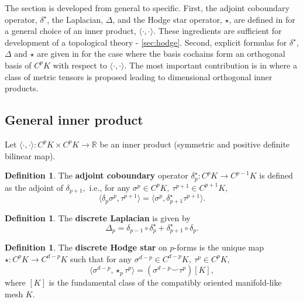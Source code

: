\documentclass{elsarticle}
\theoremstyle{definition}
\newtheorem{definition}[theorem]{Definition}
\newcommand{\R}{\mathbb{R}} %
\newcommand{\inner}[2]{\langle#1,#2\rangle}
\begin{document}
The section is developed from general to specific. First, the adjoint coboundary operator, $\delta^\star$, the Laplacian, $\Delta$, and the Hodge star operator, $\star$, are defined in  for a general choice of an inner product, $\inner{\cdot}{\cdot}$. These ingredients are sufficient for development of a topological theory - \ref{sec:hodge}. Second, explicit formulas for $\delta^\star$, $\Delta$ and $\star$ are given in  for the case where the basis cochains form an orthogonal basis of $C^p K$ with respect to $\inner{\cdot}{\cdot}$. The most important contribution is in  where a class of metric tensors is proposed leading to dimensional orthogonal inner products.

\subsection{General inner product}
\label{sec:inner_general}
Let $\inner{\cdot}{\cdot} \colon C^{p} K \times C^{p} K \to \R$ be an inner product (symmetric and positive definite bilinear map).
\begin{definition}
  The \textbf{adjoint coboundary} operator $\delta^{\star}_{p} \colon C^{p} K \to C^{p - 1} K$ is defined as the adjoint of $\delta_{p + 1},$ i.e., for any $\sigma^{p} \in C^{p} K,\ \tau^{p + 1} \in C^{p + 1} K$,
  \begin{equation}
    \inner{\delta_{p} \sigma^{p}}{\tau^{p + 1}} 
      = \inner{\sigma^{p}}{\delta^{\star}_{p + 1} \tau^{p + 1}}.
  \end{equation}
\end{definition}
\begin{definition}
  The \textbf{discrete Laplacian} is given by
  \begin{equation}
    \Delta_{p} 
      =   \delta_{p - 1} \circ \delta^{\star}_{p} 
        + \delta^{\star}_{p + 1} \circ \delta_{p}.
  \end{equation}
\end{definition}
\begin{definition}
  The \textbf{discrete Hodge star} on $p$-forms is the unique map $\star \colon C^{p} K \to C^{d - p} K$ such that for any $\sigma^{d - p} \in C^{d - p} K ,\ \tau^{p} \in C^{p} K,$
  \begin{equation}
    \inner{\sigma^{d - p}}{\star_{p} \tau^{p}} 
      = (\sigma^{d - p} \smile \tau^{p})[K],
  \end{equation}
  where $[K]$ is the fundamental class of the compatibly oriented manifold-like mesh $K$.
\end{definition}
\end{document}
